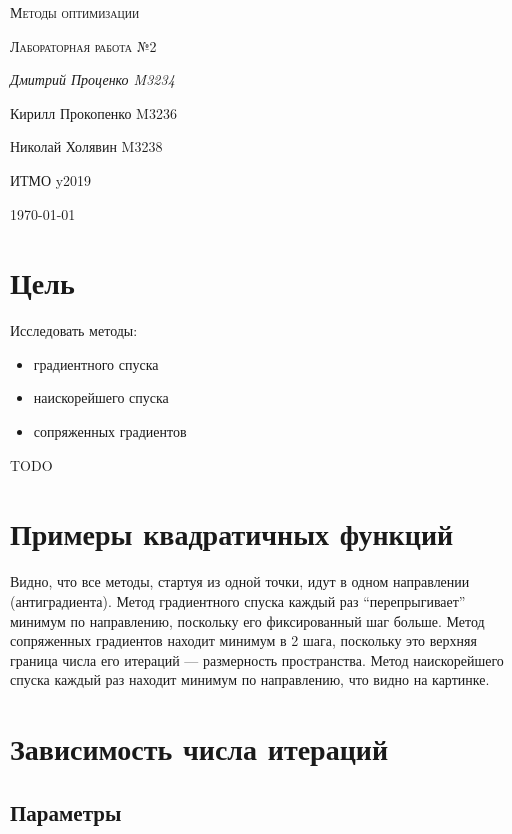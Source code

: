 \documentclass[russian, english]{article}
\begin{document}
\begin{titlepage}
\centering
	{\scshape\LARGE Методы оптимизации \par}
	\vspace{1cm}
	{\scshape\Large Лабораторная работа №2\par}
	\vspace{2cm}
	{\Large\itshape Дмитрий Проценко M3234 \par
	Кирилл Прокопенко M3236 \par
	Николай Холявин M3238 \par}
	\vfill
	ИТМО y2019
	\vfill
	{\large \today\par}
\end{titlepage}

\tableofcontents
\newpage

\section{Цель}
Исследовать методы:
\begin{itemize}
	\item градиентного спуска
	\item наискорейшего спуска
	\item сопряженных градиентов
\end{itemize}

TODO

\section{Примеры квадратичных функций}
\noindent{}
Видно, что все методы, стартуя из одной точки, идут в одном направлении (антиградиента). Метод градиентного спуска каждый раз ``перепрыгивает'' минимум по направлению, поскольку его фиксированный шаг больше. Метод сопряженных градиентов находит минимум в 2 шага, поскольку это верхняя граница числа его итераций --- размерность пространства. Метод наискорейшего спуска каждый раз находит минимум по направлению, что видно на картинке.
\section{Зависимость числа итераций}
\subsection{Параметры}
\end{document}
